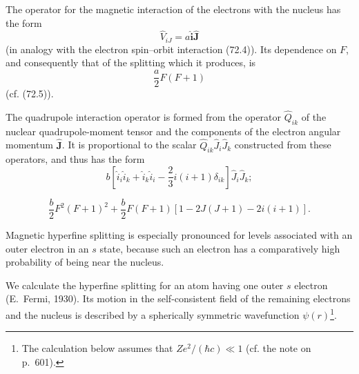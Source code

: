 The operator for the magnetic interaction of the electrons with the nucleus
has the form
\begin{equation}
 \hat V_{iJ}=a\hat{\mathbf i}\hat{\mathbf J}
 \tag{121.4}
\end{equation}
(in analogy with the electron spin--orbit interaction (72.4)). Its dependence
on $F$, and consequently that of the splitting which it produces, is
\begin{equation}
 \frac a2F(F+1)
 \tag{121.5}
\end{equation}
(cf. (72.5)).

The quadrupole interaction operator is formed from the operator
$\hat Q_{ik}$ of the nuclear quadrupole-moment tensor and the components of
the electron angular momentum $\hat{\mathbf J}$. It is proportional to the
scalar $\hat Q_{ik}\hat J_i\hat J_k$ constructed from these operators, and
thus has the form
\begin{equation}
 b\left[\hat i_i\hat i_k+\hat i_k\hat i_i
 -\frac23i(i+1)\delta_{ik}\right]\hat J_i\hat J_k;
 \tag{121.6}
\end{equation}


\begin{equation}
 \frac b2F^2(F+1)^2
 +\frac b2F(F+1)[1-2J(J+1)-2i(i+1)].
 \tag{121.7}
\end{equation}

Magnetic hyperfine splitting is especially pronounced for levels associated
with an outer electron in an $s$ state, because such an electron has a
comparatively high probability of being near the nucleus.

We calculate the hyperfine splitting for an atom having one outer $s$
electron (E.~Fermi, 1930). Its motion in the self-consistent field of the
remaining electrons and the nucleus is described by a spherically symmetric
wavefunction $\psi(r)$\footnote{The calculation below assumes that
$Ze^2/(\hbar c)\ll1$ (cf. the note on p.~601).}.

